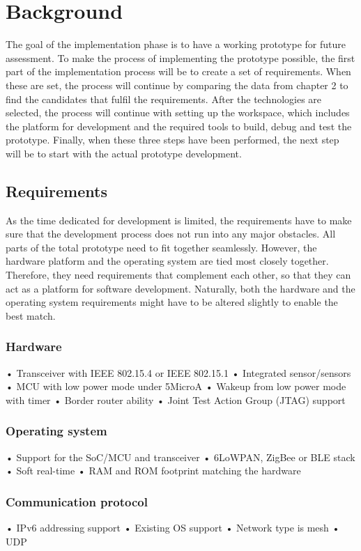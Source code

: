 \section{Background}

The goal of the implementation phase is to have a working prototype for future assessment.
To make the process of implementing the prototype possible,
	the first part of the implementation process will be to create a set of requirements.
When these are set,
	the process will continue by comparing the data from chapter 2 to find the candidates that fulfil the requirements.
After the technologies are selected,
	the process will continue with setting up the workspace,
	which includes the platform for development and the required tools to build,
	debug and test the prototype.
Finally,
	when these three steps have been performed,
	the next step will be to start with the actual prototype development.
	
\subsection{Requirements}
As the time dedicated for development is limited,
	the requirements have to make sure that the development process does not run into any major obstacles.
All parts of the total prototype need to fit together seamlessly.
However,
	the hardware platform and the operating system are tied most closely together.
Therefore,
	they need requirements that complement each other,
	so that they can act as a platform for software development.
Naturally,
	both the hardware and the operating system requirements might have to be altered slightly to enable the best match.
	
\subsubsection{Hardware}
• Transceiver with IEEE 802.15.4 or IEEE 802.15.1
• Integrated sensor/sensors
• MCU with low power mode under 5MicroA
• Wakeup from low power mode with timer
• Border router ability
• Joint Test Action Group (JTAG) support

\subsubsection{Operating system}
• Support for the SoC/MCU and transceiver
• 6LoWPAN, ZigBee or BLE stack
• Soft real-time
• RAM and ROM footprint matching the hardware

\subsubsection{Communication protocol}
• IPv6 addressing support
• Existing OS support
• Network type is mesh
• UDP

